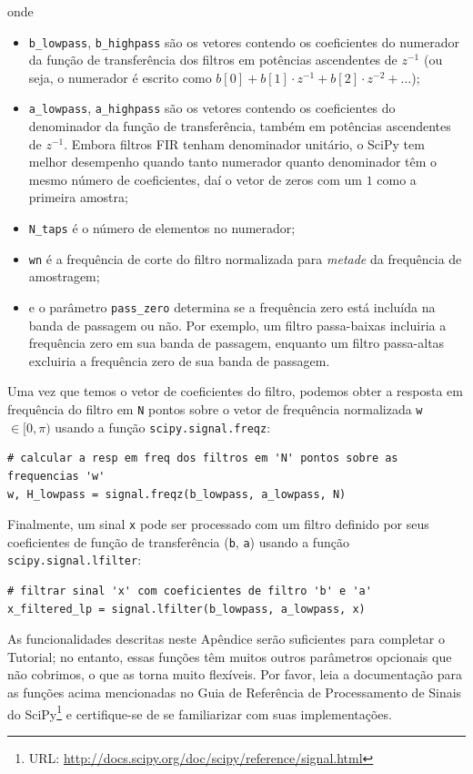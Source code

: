 \documentclass[a4paper,twoside,12pt]{article}
\begin{document}
	onde
	
	\begin{itemize}
		
		\item {\tt b\_lowpass}, {\tt b\_highpass} são os vetores contendo os coeficientes do numerador da função de transferência dos filtros em potências ascendentes de $z^{-1}$ (ou seja, o numerador é escrito como $b[0] + b[1] \cdot z^{-1} + b[2] \cdot z^{-2} + \ldots$);
		
		\item {\tt a\_lowpass}, {\tt a\_highpass} são os vetores contendo os coeficientes do denominador da função de transferência, também em potências ascendentes de $z^{-1}$. Embora filtros FIR tenham denominador unitário, o SciPy tem melhor desempenho quando tanto numerador quanto denominador têm o mesmo número de coeficientes, daí o vetor de zeros com um $1$ como a primeira amostra;
		
		\item {\tt N\_taps} é o número de elementos no numerador;
		
		\item {\tt wn} é a frequência de corte do filtro normalizada para \emph{metade} da frequência de amostragem;
		\item e o parâmetro {\tt pass\_zero} determina se a frequência zero está incluída na banda de passagem ou não. Por exemplo, um filtro passa-baixas incluiria a frequência zero em sua banda de passagem, enquanto um filtro passa-altas excluiria a frequência zero de sua banda de passagem.
	\end{itemize}
	
	Uma vez que temos o vetor de coeficientes do filtro, podemos obter a resposta em frequência do filtro em {\tt N} pontos sobre o vetor de frequência normalizada {\tt w} $\in [0, \pi)$ usando a função {\tt scipy.signal.freqz}:
	
	\begin{lstlisting}[frame=single]
# calcular a resp em freq dos filtros em 'N' pontos sobre as frequencias 'w'
w, H_lowpass = signal.freqz(b_lowpass, a_lowpass, N)
	\end{lstlisting}
	
	Finalmente, um sinal {\tt x} pode ser processado com um filtro definido por seus coeficientes de função de transferência ({\tt b}, {\tt a}) usando a função {\tt scipy.signal.lfilter}:
	
	\begin{lstlisting}[frame=single]
# filtrar sinal 'x' com coeficientes de filtro 'b' e 'a'
x_filtered_lp = signal.lfilter(b_lowpass, a_lowpass, x)
	\end{lstlisting}
	
	As funcionalidades descritas neste Apêndice serão suficientes para completar o Tutorial; no entanto, essas funções têm muitos outros parâmetros opcionais que não cobrimos, o que as torna muito flexíveis. Por favor, leia a documentação para as funções acima mencionadas no Guia de Referência de Processamento de Sinais do SciPy\footnote{URL: \url{http://docs.scipy.org/doc/scipy/reference/signal.html}} e certifique-se de se familiarizar com suas implementações.
	
\end{document}

